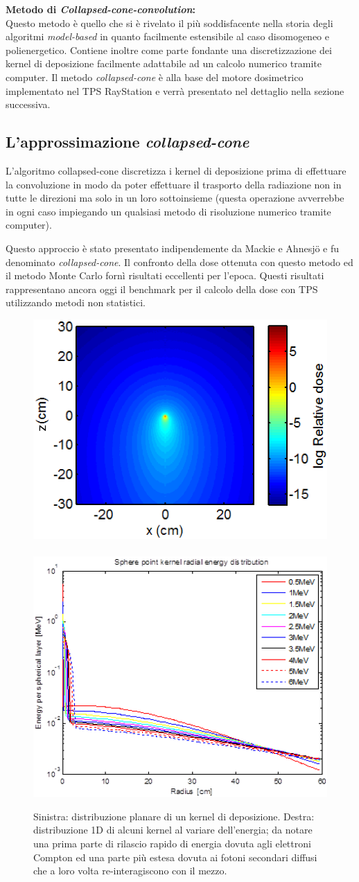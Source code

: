 {\textbf{Metodo di \textit{Collapsed-cone-convolution}:\\}
Questo metodo è quello che si è rivelato il più soddisfacente nella storia degli algoritmi \textit{model-based} in quanto facilmente estensibile al caso disomogeneo e polienergetico. Contiene inoltre come parte fondante una discretizzazione dei kernel di deposizione facilmente adattabile ad un calcolo numerico tramite computer. Il metodo \textit{collapsed-cone} è alla base del motore dosimetrico implementato nel TPS RayStation e verrà presentato nel dettaglio nella sezione successiva.


\subsection{L'approssimazione \textit{collapsed-cone}}
L'algoritmo collapsed-cone discretizza i kernel di deposizione prima di effettuare la convoluzione in modo da poter effettuare il trasporto della radiazione non in tutte le direzioni ma solo in un loro sottoinsieme (questa operazione avverrebbe in ogni caso impiegando un qualsiasi metodo di risoluzione numerico tramite computer).

Questo approccio è stato presentato indipendemente da Mackie \cite{Reckwerdt1992} e Ahnesj\"{o} \cite{Ahnesjo1989} e fu denominato \textit{collapsed-cone}. Il confronto della dose ottenuta con questo metodo ed il metodo Monte Carlo fornì risultati eccellenti per l'epoca. Questi risultati rappresentano ancora oggi il benchmark per il calcolo della dose con TPS utilizzando metodi non statistici.
\begin{figure}[!t]
\centering
\includegraphics[width=.45\textwidth]{./cap1/kern_ray1.png}$\quad$
\includegraphics[width=.45\textwidth]{./cap1/kern_ray2.png}
\caption{Sinistra: distribuzione planare di un kernel di deposizione. Destra: distribuzione 1D di alcuni kernel al variare dell'energia; da notare una prima parte di rilascio rapido di energia dovuta agli elettroni Compton ed una parte più estesa dovuta ai fotoni secondari diffusi che a loro volta re-interagiscono con il mezzo.}
\label{fig:kern_ray}
\end{figure}

}
